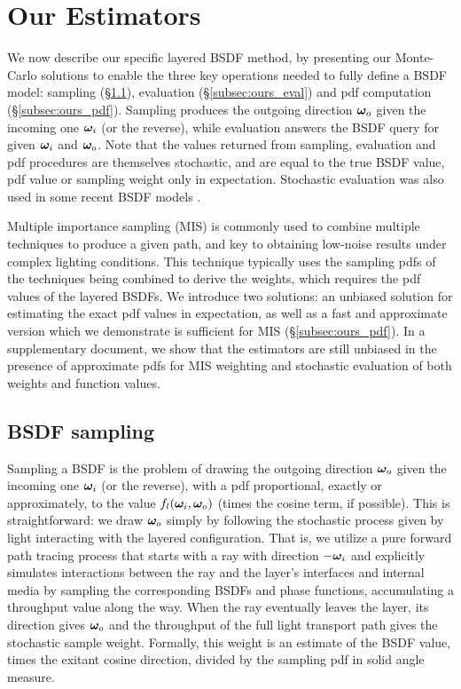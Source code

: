\section{Our Estimators}
\label{sec:layeredbsdf:ours}

We now describe our specific layered BSDF method,
by presenting our Monte-Carlo solutions to enable the three key operations needed to fully define a BSDF model:
sampling (\S\ref{subsec:ours_sample}), evaluation (\S\ref{subsec:ours_eval}) and pdf computation (\S\ref{subsec:ours_pdf}).
Sampling produces the outgoing direction $\bm{\omega}_o$ given the incoming one $\bm{\omega}_i$ (or the reverse), while evaluation answers the BSDF query for given $\bm{\omega}_i$ and $\bm{\omega}_o$. Note that the values returned from sampling, evaluation and pdf procedures are themselves stochastic, and are equal to the true BSDF value, pdf value or sampling weight only in expectation. Stochastic evaluation was also used in some recent BSDF models \cite{heitz2016multiple}. 

Multiple importance sampling (MIS) is commonly used to combine multiple techniques to produce a given path, and key to obtaining low-noise results under complex lighting conditions. This technique typically uses the sampling pdfs of the techniques being combined to derive the weights, which requires the pdf values of the layered BSDFs. We introduce two solutions: an unbiased solution for estimating the exact pdf values in expectation, as well as a fast and approximate version which we demonstrate is sufficient for MIS (\S\ref{subsec:ours_pdf}). In a supplementary document, we show that the estimators are still unbiased in the presence of approximate pdfs for MIS weighting and stochastic evaluation of both weights and function values.

\subsection{BSDF sampling}
\label{subsec:ours_sample}

Sampling a BSDF is the problem of drawing the outgoing direction $\bm{\omega}_o$ given the incoming one $\bm{\omega}_i$ (or the reverse), with a pdf proportional, exactly or approximately, to the value $f_l(\bm{\omega}_i, \bm{\omega}_o)$ (times the cosine term, if possible).
This is straightforward: we draw $\bm{\omega}_o$ simply by following the stochastic process given by light interacting with the layered configuration.
That is, we utilize a pure forward path tracing process that starts with a ray with direction $-\bm{\omega}_i$ and explicitly simulates interactions between the ray and the layer's interfaces and internal media by sampling the corresponding BSDFs and phase functions, accumulating a throughput value along the way.
When the ray eventually leaves the layer, its direction gives $\bm{\omega}_o$ and the throughput of the full light transport path gives the stochastic sample weight. Formally, this weight is an estimate of the BSDF value, times the exitant cosine direction, divided by the sampling pdf in solid angle measure.

